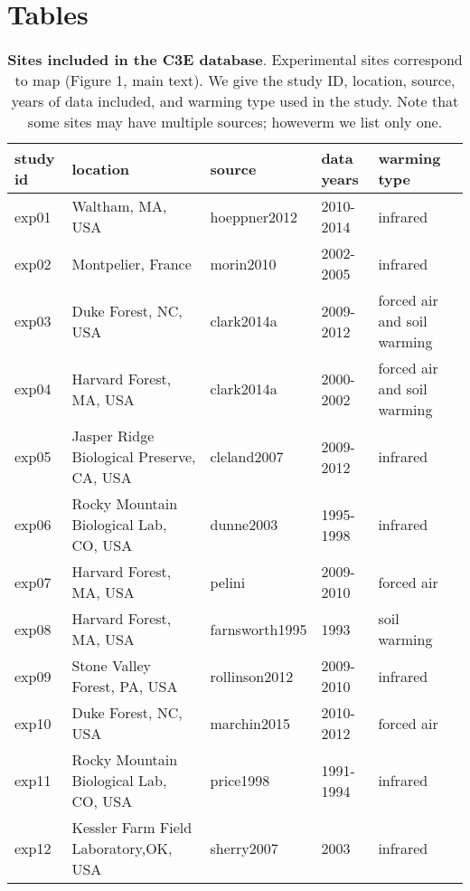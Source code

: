 \documentclass{article}
\begin{document}
\section* {Tables}
\begin{table}
  \caption{{\bf Sites included in the C3E database}. Experimental sites
    correspond to map (Figure 1, main text). We give the study ID, location, source, years of data included, and warming type used in the study. Note that some sites may have
    multiple sources; howeverm we list only one.}
\begin{footnotesize} 
   \begin{tabular}{| p{1cm} | p{4.5cm} | p{2.5cm} | p{1cm} | p{2cm} |}
    \hline
  study id & location & source & data years & warming type \\ \hline
    exp01 & Waltham, MA, USA & hoeppner2012 & 2010-2014 & infrared\\ \hline
    exp02 & Montpelier, France & morin2010 & 2002-2005 & infrared\\ \hline
    exp03 & Duke Forest, NC, USA & clark2014a & 2009-2012 & forced air and soil warming\\ \hline
    exp04 & Harvard Forest, MA, USA & clark2014a & 2000-2002 & forced air and soil warming\\ \hline
    exp05 & Jasper Ridge Biological Preserve, CA, USA &cleland2007 & 2009-2012 & infrared\\ \hline
    exp06 & Rocky Mountain Biological Lab, CO, USA & dunne2003 & 1995-1998 & infrared\\ \hline
    exp07 & Harvard Forest, MA, USA & pelini & 2009-2010 & forced air \\ \hline
    exp08 & Harvard Forest, MA, USA & farnsworth1995 & 1993 & soil warming \\ \hline
    exp09 & Stone Valley Forest, PA, USA & rollinson2012 & 2009-2010 & infrared \\ \hline
    exp10 & Duke Forest, NC, USA & marchin2015 & 2010-2012 & forced air \\ \hline
    exp11 & Rocky Mountain Biological Lab, CO, USA & price1998 & 1991-1994 & infrared\\ \hline
    exp12 & Kessler Farm Field Laboratory,OK, USA & sherry2007 & 2003 & infrared\\ \hline
    \end{tabular}    
\end{footnotesize} 
    \end{table}
\end{document}
